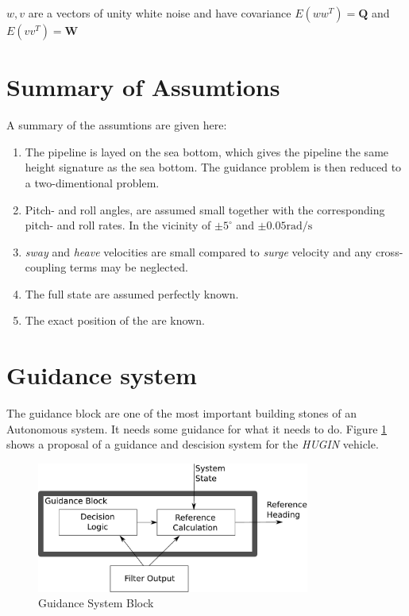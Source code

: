 	$w, v$ are a vectors of unity white noise and have covariance $E(ww^T) = \mathbf{Q}$ and $E(vv^T) =
	\mathbf{W}$


\section{Summary of Assumtions}
	A summary of the assumtions are given here:
	\begin{enumerate}
		\item The pipeline is layed on the sea bottom, which gives the pipeline the same
		height signature as the sea bottom. The guidance problem is then reduced to a
		two-dimentional problem.
		\item Pitch- and roll angles, are assumed small together with the corresponding pitch- and
		roll rates. In the vicinity of $\pm 5^{\circ}$ and $\pm 0.05 \mathrm{rad/s}$
		\item \textit{sway} and \textit{heave} velocities are small compared to \textit{surge}
		velocity and any cross-coupling terms may be neglected.
		\item The full state are assumed perfectly known. 
		\item The exact position of the are known.
	\end{enumerate}
		
\section{Guidance system}
	The guidance block are one of the most important building stones of an Autonomous system. It needs
	some guidance for what it needs to do. Figure \ref{fig:ch2-Guidance-block} shows a proposal of a
	guidance and descision system for the \textit{HUGIN} vehicle.
	\begin{figure}[htbp]
		\centering
		\includegraphics[width=0.8\textwidth]{pics/guidance}
		\caption{Guidance System Block}
		\label{fig:ch2-Guidance-block}
	\end{figure}

